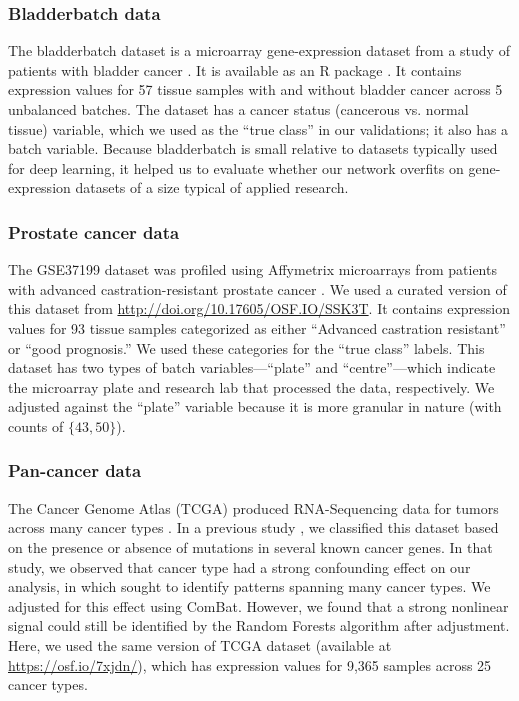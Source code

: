 \documentclass[11pt]{article}
\begin{document}
\subsubsection{Bladderbatch data}

The bladderbatch dataset is a microarray gene-expression dataset from a study of patients with bladder cancer \cite{dyrskjot_gene_2004}.
It is available as an R package \cite{leek_bladderbatch_2017}.
It contains expression values for 57 tissue samples with and without bladder cancer across 5 unbalanced batches.
The dataset has a cancer status (cancerous vs. normal tissue) variable, which we used as the ``true class'' in our validations; it also has a batch variable.
Because bladderbatch is small relative to datasets typically used for deep learning, it helped us to evaluate whether our network overfits on gene-expression datasets of a size typical of applied research.

\subsubsection{Prostate cancer data}

The GSE37199 dataset was profiled using Affymetrix microarrays from patients with advanced castration-resistant prostate cancer \cite{olmos_prognostic_2012}.
We used a curated version of this dataset from \url{http://doi.org/10.17605/OSF.IO/SSK3T}\cite{golightly_curated_2018}.
It contains expression values for 93 tissue samples categorized as either ``Advanced castration resistant'' or ``good prognosis.''
We used these categories for the ``true class'' labels.
This dataset has two types of batch variables---``plate'' and ``centre''---which indicate the microarray plate and research lab that processed the data, respectively.
We adjusted against the ``plate'' variable because it is more granular in nature (with counts of $\{43, 50\}$).

\subsubsection{Pan-cancer data}

The Cancer Genome Atlas (TCGA) produced RNA-Sequencing data for tumors across many cancer types \cite{the_cancer_genome_atlas_research_network_cancer_2013}.
In a previous study \cite{dayton_classifying_2017-1}, we classified this dataset based on the presence or absence of mutations in several known cancer genes.
In that study, we observed that cancer type had a strong confounding effect on our analysis, in which sought to identify patterns spanning many cancer types. We adjusted for this effect using ComBat.
However, we found that a strong nonlinear signal could still be identified by the Random Forests algorithm after adjustment.
Here, we used the same version of TCGA dataset (available at \url{https://osf.io/7xjdn/}),
which has expression values for 9,365 samples across 25 cancer types.
\end{document}
